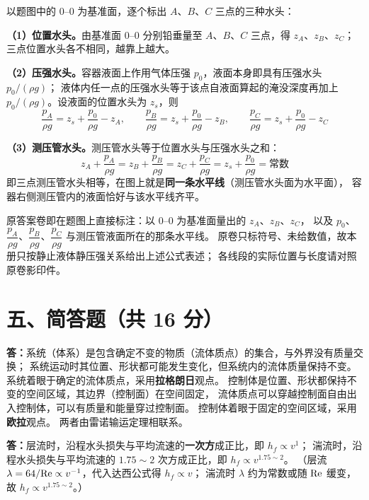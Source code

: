 
以题图中的 $0$--$0$ 为基准面，逐个标出 $A$、$B$、$C$ 三点的三种水头：

\textbf{（1）位置水头。}由基准面 $0$--$0$ 分别铅垂量至 $A$、$B$、$C$ 三点，得 $z_A$、$z_B$、$z_C$；
三点位置水头各不相同，越靠上越大。

\textbf{（2）压强水头。}容器液面上作用气体压强 $p_0$，液面本身即具有压强水头 $p_0/(\rho g)$；
液体内任一点的压强水头等于该点自液面算起的淹没深度再加上 $p_0/(\rho g)$。设液面的位置水头为 $z_s$，则
\[
\frac{p_A}{\rho g}=z_s+\frac{p_0}{\rho g}-z_A,\qquad
\frac{p_B}{\rho g}=z_s+\frac{p_0}{\rho g}-z_B,\qquad
\frac{p_C}{\rho g}=z_s+\frac{p_0}{\rho g}-z_C
\]

\textbf{（3）测压管水头。}测压管水头等于位置水头与压强水头之和：
\[
z_A+\frac{p_A}{\rho g}=z_B+\frac{p_B}{\rho g}=z_C+\frac{p_C}{\rho g}
=z_s+\frac{p_0}{\rho g}=\text{常数}
\]
即三点测压管水头相等，在图上就是\textbf{同一条水平线}（测压管水头面为水平面），
容器右侧测压管内的液面恰好与该水平线齐平。

\begin{tishi}
原答案卷即在题图上直接标注：以 $0$--$0$ 为基准面量出的 $z_A$、$z_B$、$z_C$，
以及 $p_0$、$\dfrac{p_A}{\rho g}$、$\dfrac{p_B}{\rho g}$、$\dfrac{p_C}{\rho g}$ 与测压管液面所在的那条水平线。
原卷只标符号、未给数值，故本册只按静止液体静压强关系给出上述公式表述；
各线段的实际位置与长度请对照原卷影印件。
\end{tishi}

\section{五、简答题（共 16 分）}


\textbf{答：}系统（体系）是包含确定不变的物质（流体质点）的集合，与外界没有质量交换；
系统运动时其位置、形状都可能发生变化，但系统内的流体质量保持不变。
系统着眼于确定的流体质点，采用\textbf{拉格朗日}观点。
控制体是位置、形状都保持不变的空间区域，其边界（控制面）在空间固定，
流体质点可以穿越控制面自由出入控制体，可以有质量和能量穿过控制面。
控制体着眼于固定的空间区域，采用\textbf{欧拉}观点。
两者由雷诺输运定理相联系。


\textbf{答：}层流时，沿程水头损失与平均流速的\textbf{一次方}成正比，即 $h_f\propto v^{1}$；
湍流时，沿程水头损失与平均流速的 $1.75\sim2$ 次方成正比，即 $h_f\propto v^{1.75\sim2}$。
（层流 $\lambda=64/\mathrm{Re}\propto v^{-1}$，代入达西公式得 $h_f\propto v$；
湍流时 $\lambda$ 约为常数或随 $\mathrm{Re}$ 缓变，故 $h_f\propto v^{1.75\sim2}$。）

